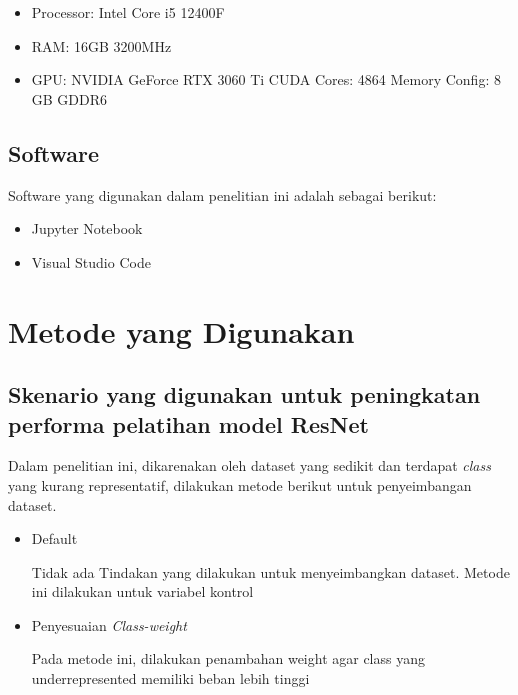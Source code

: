 \begin{itemize}
	\item Processor: Intel Core i5 12400F
	\item RAM: 16GB 3200MHz
	\item GPU: NVIDIA GeForce RTX 3060 Ti
	\subitem CUDA Cores: 4864
	\subitem Memory Config: 8 GB GDDR6
\end{itemize}

\subsection{Software}
\label{sec:313}

Software yang digunakan dalam penelitian ini adalah sebagai berikut:
\begin{itemize}
	\item Jupyter Notebook
	\item Visual Studio Code
\end{itemize}

\section{Metode yang Digunakan}
\label{sec:32}

\subsection{Skenario yang digunakan untuk peningkatan performa pelatihan model ResNet}
Dalam penelitian ini, dikarenakan oleh dataset yang sedikit dan terdapat \emph{class} yang kurang representatif, dilakukan metode berikut untuk penyeimbangan dataset.
\begin{itemize}
	\item Default

	Tidak ada Tindakan yang dilakukan untuk menyeimbangkan dataset. Metode ini dilakukan untuk variabel kontrol
	\item Penyesuaian \emph{Class-weight}

	Pada metode ini, dilakukan penambahan weight agar class yang underrepresented memiliki beban lebih tinggi
\end{itemize}


